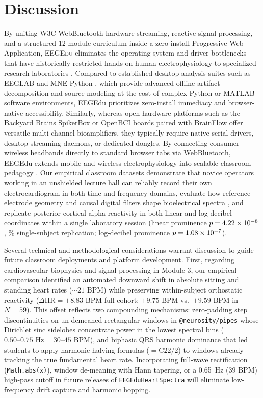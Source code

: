 \documentclass[11pt,letterpaper]{article}
\begin{document}
\section{Discussion}
By uniting W3C WebBluetooth hardware streaming, reactive signal processing, and a structured 12-module curriculum inside a zero-install Progressive Web Application, \textsc{EEGEdu} eliminates the operating-system and driver bottlenecks that have historically restricted hands-on human electrophysiology to specialized research laboratories \citep{kuziek2017transitioning,kuziek2018increasing,mathewson2017high}. Compared to established desktop analysis suites such as EEGLAB \citep{delorme2004eeglab} and MNE-Python \citep{gramfort2013meg}, which provide advanced offline artifact decomposition and source modeling at the cost of complex Python or MATLAB software environments, EEGEdu prioritizes zero-install immediacy and browser-native accessibility. Similarly, whereas open hardware platforms such as the Backyard Brains SpikerBox \citep{marzullo2012spikerbox} or OpenBCI boards paired with BrainFlow offer versatile multi-channel bioamplifiers, they typically require native serial drivers, desktop streaming daemons, or dedicated dongles. By connecting consumer wireless headbands directly to standard browser tabs via WebBluetooth, EEGEdu extends mobile and wireless electrophysiology into scalable classroom pedagogy \citep{debener2012}. Our empirical classroom datasets demonstrate that novice operators working in an unshielded lecture hall can reliably record their own electrocardiogram in both time and frequency domains, evaluate how reference electrode geometry and causal digital filters shape bioelectrical spectra \citep{keil2022recommendations}, and replicate posterior cortical alpha reactivity in both linear and log-decibel coordinates within a single laboratory session (linear prominence $p = 4.22\times 10^{-8}$, \PctRepTemp\% single-subject replication; log-decibel prominence $p = 1.08\times 10^{-7}$).

Several technical and methodological considerations warrant discussion to guide future classroom deployments and platform development. First, regarding cardiovascular biophysics and signal processing in Module 3, our empirical comparison identified an automated downward shift in absolute sitting and standing heart rates ($\sim 21\text{ BPM}$) while preserving within-subject orthostatic reactivity ($\Delta\text{HR} = +8.83\text{ BPM}$ full cohort; $+9.75\text{ BPM}$ vs.\ $+9.59\text{ BPM}$ in $N = 59$). This offset reflects two compounding mechanisms: zero-padding step discontinuities on un-demeaned rectangular windows in \texttt{@neurosity/pipes} whose Dirichlet sinc sidelobes concentrate power in the lowest spectral bins ($0.50\text{--}0.75\text{ Hz} = 30\text{--}45\text{ BPM}$), and biphasic QRS harmonic dominance that led students to apply harmonic halving formulas ($=\text{C22}/2$) to windows already tracking the true fundamental heart rate. Incorporating full-wave rectification (\texttt{Math.abs(x)}), window de-meaning with Hann tapering, or a 0.65~Hz ($39\text{ BPM}$) high-pass cutoff in future releases of \texttt{EEGEduHeartSpectra} will eliminate low-frequency drift capture and harmonic hopping.
\end{document}
